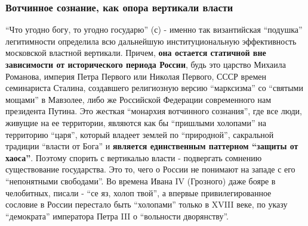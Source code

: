  
 
 
 
 

\subsubsection{Вотчинное сознание, как опора вертикали власти}

\enquote{Что угодно богу, то угодно государю} (с) - именно так византийская \enquote{подушка}
легитимности определила всю дальнейшую институциональную эффективность
московской властной вертикали. Причем, \textbf{она остается статичной вне зависимости
от исторического периода России}, будь это царство Михаила Романова, империя
Петра Первого или Николая Первого, СССР времен семинариста Сталина, создавшего
религиозную версию \enquote{марксизма} со \enquote{святыми мощами} в Мавзолее, либо же
Российской Федерации современного нам президента Путина. Это жесткая \enquote{монархия
вотчинного сознания}, где все люди, живущие на ее территории, являются как бы
\enquote{пришлыми холопами} на территорию \enquote{царя}, который владеет землей по
\enquote{природной}, сакральной традиции \enquote{власти от Бога} и \textbf{является единственным
паттерном \enquote{защиты от хаоса}}. Поэтому спорить с вертикалью власти - подвергать
сомнению существование государства. Это то, чего о России не понимают на западе
с его \enquote{непонятными свободами}. Во времена Ивана IV (Грозного) даже бояре в
челобитных, писали - \enquote{се яз, холоп твой}, а впервые привилегированное сословие
в России перестало быть \enquote{холопами} только в XVIII веке, по указу \enquote{демократа}
императора Петра III о \enquote{вольности дворянству}.

